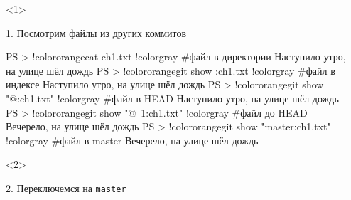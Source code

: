\documentclass[9pt, aspectratio=1610]{beamer}
\begin{document}
\begin{frame}[t,fragile]
\begin{columns}[onlytextwidth]
\begin{column}[T]{\colA\linewidth}
			
			
		\end{column}
		\begin{column}[T]{\linewidth}
			
			\begin{minipage}[t][5.2cm][t]{\textwidth}		
				
			
				\begin{onlyenv}<1>					
					
					1. Посмотрим файлы из других  коммитов
					
					\begin{VerbatimCmd}[gobble=6]
						
						PS > !color{orange}cat ch1.txt    !color{gray} #файл в директории    
						Наступило утро, на улице шёл дождь
						PS > !color{orange}git show :ch1.txt   !color{gray} #файл в индексе  
						Наступило утро, на улице шёл дождь			
						PS > !color{orange}git show "@:ch1.txt"  !color{gray} #файл в HEAD  
						Наступило утро, на улице шёл дождь
						PS > !color{orange}git show "@~1:ch1.txt" !color{gray} #файл до HEAD
						Вечерело, на улице шёл дождь
						PS > !color{orange}git show "master:ch1.txt" !color{gray} #файл в master
						Вечерело, на улице шёл дождь
						
					\end{VerbatimCmd}
					
					
					
					
				\end{onlyenv}		
				
				\begin{onlyenv}<2>					
					
					2. Переключемся на \Verb|master|
					
					\begin{VerbatimCmd}[gobble=6]
						

\end{VerbatimCmd}
\end{onlyenv}
\end{minipage}
\end{column}
\end{columns}
\end{frame}
\end{document}
